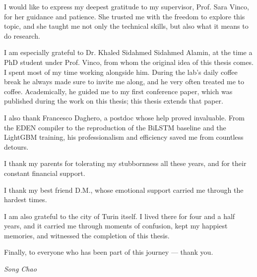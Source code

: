 


I would like to express my deepest gratitude to my supervisor, Prof. Sara Vinco, for her guidance and patience. She trusted me with the freedom to explore this topic, and she taught me not only the technical skills, but also what it means to do research.

I am especially grateful to Dr. Khaled Sidahmed Sidahmed Alamin, at the time a PhD student under Prof. Vinco, from whom the original idea of this thesis comes. I spent most of my time working alongside him. During the lab's daily coffee break he always made sure to invite me along, and he very often treated me to coffee. Academically, he guided me to my first conference paper, which was published during the work on this thesis; this thesis extends that paper.

I also thank Francesco Daghero, a postdoc whose help proved invaluable. From the EDEN compiler to the reproduction of the BiLSTM baseline and the LightGBM training, his professionalism and efficiency saved me from countless detours.

I thank my parents for tolerating my stubbornness all these years, and for their constant financial support.

I thank my best friend D.M., whose emotional support carried me through the hardest times.

I am also grateful to the city of Turin itself. I lived there for four and a half years, and it carried me through moments of confusion, kept my happiest memories, and witnessed the completion of this thesis.

Finally, to everyone who has been part of this journey --- thank you.

\vspace*{5\baselineskip}

\begin{flushright}
    \textit{Song Chao}
\end{flushright}